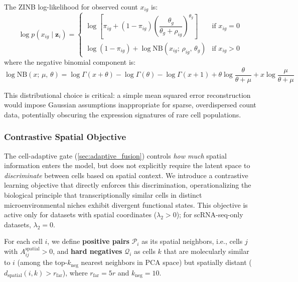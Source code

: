 \documentclass{article}
\begin{document}
The ZINB log-likelihood for observed count $x_{ig}$ is:
\begin{equation}
    \log p(x_{ig} \mid \mathbf{z}_i) =
    \begin{cases}
        \log\!\left[\pi_{ig} + (1 - \pi_{ig})\left(\dfrac{\theta_g}{\theta_g + \rho_{ig}}\right)^{\!\theta_g}\right] & \text{if } x_{ig} = 0 \\[10pt]
        \log(1 - \pi_{ig}) + \log \text{NB}(x_{ig};\, \rho_{ig},\, \theta_g) & \text{if } x_{ig} > 0
    \end{cases}
    \label{eq:zinb_ll}
\end{equation}
where the negative binomial component is:
\begin{equation}
    \log \text{NB}(x;\, \mu,\, \theta) = \log \Gamma(x + \theta) - \log \Gamma(\theta) - \log \Gamma(x + 1) + \theta \log\!\frac{\theta}{\theta + \mu} + x \log\!\frac{\mu}{\theta + \mu}
    \label{eq:nb}
\end{equation}

This distributional choice is critical: a simple mean squared error reconstruction would impose Gaussian assumptions inappropriate for sparse, overdispersed count data, potentially obscuring the expression signatures of rare cell populations.


\subsubsection{Contrastive Spatial Objective}
\label{sec:contrastive}

The cell-adaptive gate (\cref{sec:adaptive_fusion}) controls \textit{how much} spatial information enters the model, but does not explicitly require the latent space to \textit{discriminate} between cells based on spatial context. We introduce a contrastive learning objective that directly enforces this discrimination, operationalizing the biological principle that transcriptionally similar cells in distinct microenvironmental niches exhibit divergent functional states. This objective is active only for datasets with spatial coordinates ($\lambda_2 > 0$); for scRNA-seq-only datasets, $\lambda_2 = 0$.

For each cell $i$, we define \textbf{positive pairs} $\mathcal{P}_i$ as its spatial neighbors, i.e., cells $j$ with $A^{\text{spatial}}_{ij} > 0$, and \textbf{hard negatives} $\mathcal{Q}_i$ as cells $k$ that are molecularly similar to $i$ (among the top-$k_{\text{neg}}$ nearest neighbors in PCA space) but spatially distant ($d_{\text{spatial}}(i, k) > r_{\text{far}}$), where $r_{\text{far}} = 5r$ and $k_{\text{neg}} = 10$.
\end{document}
